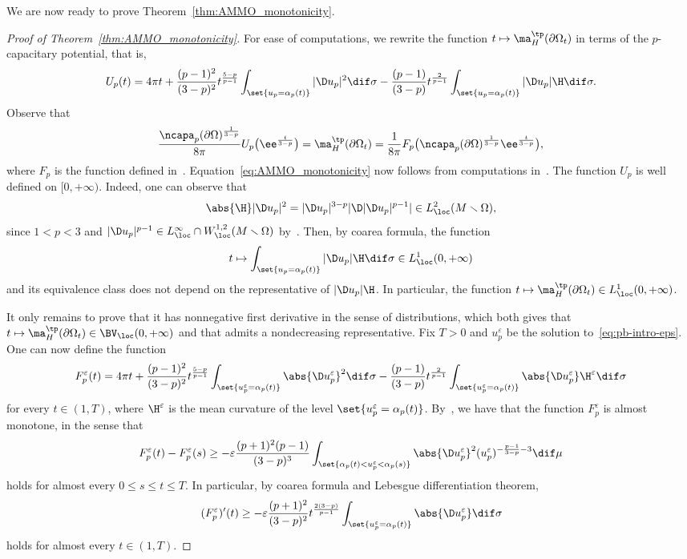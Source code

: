 We are now ready to prove Theorem~\ref{thm:AMMO_monotonicity}.

\begin{proof}[Proof of Theorem~\ref{thm:AMMO_monotonicity}] For ease of computations, we rewrite the function $t\mapsto \ma_{H}^{\tp}(\partial \Omega_t)$ in terms of the $p$-capacitary potential, that is,
\[
 U_p(t)= 4 \pi t + \frac{(p-1)^2}{(3-p)^2} t^{\frac{5-p}{p-1}} \int_{\set{u_p = \alpha_p(t)}} | \D u_p |^2 \dif \sigma -\frac{(p-1)}{(3-p)} t^{\frac{2}{p-1}} \int_{\set{u_p = \alpha_p(t)}} | \D u_p |\H \dif \sigma.
\]
Observe that
\[
 \frac{\ncapa_p(\partial \Omega)^\frac{1}{3-p}}{8\pi} U_p\big(\ee^{\frac{t}{3-p}}\big) = \ma_{H}^{\tp}(\partial \Omega_t)= \frac{1}{8\pi}F_p\big(\ncapa_p(\partial \Omega)^\frac{1}{3-p} \ee^{\frac{t}{3-p}}\big),
\]
where $F_p$ is the function defined in~\cite{agostiniani_riemannianpenroseinequalitynonlinear_2022}. Equation~\eqref{eq:AMMO_monotonicity} now follows from computations in~\cite[Section 1.2]{agostiniani_riemannianpenroseinequalitynonlinear_2022}. The function $U_p$ is well defined on $[0,+\infty)$. Indeed, one can observe that
\[
 \abs{ \H} | \D u_p |^2 = | \D u_p |^{3-p} | \D | \D u_p |^{p-1}| \in L^2_{\loc}(M\smallsetminus \Omega),
\]
since $1<p<3$ and $| \D u_p |^{p-1} \in L^\infty_{\loc}\cap W^{1,2}_{\loc} (M\smallsetminus \Omega)$ by~\cite[Lemma~2.1]{lou_singularsetslocalsolutions_2008}. Then, by coarea formula, the function
\[
 t \mapsto \int_{\set{u_p= \alpha_p(t)}} | \D u_p | \H \dif \sigma\in L^1_{\loc}(0,+\infty)
\]
and its equivalence class does not depend on the representative of $| \D u_p | \H $. In particular, the function $t\mapsto \ma_{H}^{\tp}(\partial \Omega_t) \in L^1_{\loc}(0,+\infty)$.

It only remains to prove that it has nonnegative first derivative in the sense of distributions, which both gives that $t\mapsto \ma_{H}^{\tp}(\partial \Omega_t) \in \BV_{\loc}(0,+\infty)$ and that admits a nondecreasing representative. Fix $T>0$ and $u^\varepsilon_p$ be the solution to~\eqref{eq:pb-intro-eps}. One can now define the function
\[
 F_p^\varepsilon(t)= 4 \pi t + \frac{(p-1)^2}{(3-p)^2} t^{\frac{5-p}{p-1}} \int_{\set{u^\varepsilon_p = \alpha_p(t)}} \abs{ \D u^\varepsilon_p}^2 \dif \sigma -\frac{(p-1)}{(3-p)} t^{\frac{2}{p-1}} \int_{\set{u^\varepsilon_p = \alpha_p(t)}} \abs{ \D u^\varepsilon_p}\H^\varepsilon\dif \sigma
\]
for every $t \in (1,T)$, where $\H^\varepsilon$ is the mean curvature of the level $\set{u^\varepsilon_p = \alpha_p(t)}$. By~\cite[Lemma~1.2]{agostiniani_riemannianpenroseinequalitynonlinear_2022}, we have that the function $F^\varepsilon_p$ is almost monotone, in the sense that
\[
 F^\varepsilon_p(t)- F^\varepsilon_p(s) \geq -\varepsilon
 \frac{(p+1)^2(p-1)}{(3-p)^3} \int_{ \set{\alpha_p(t) < u^\varepsilon_p<\alpha_p(s)}}\abs{ \D u_p^\varepsilon}^2(u^\varepsilon_p)^{-\frac{p-1}{3-p}-3} \dif \mu
\]
holds for almost every $0\leq s\leq t \leq T$.
In particular, by coarea formula and Lebesgue differentiation theorem,
\[
 (F^\varepsilon_p)'(t) \geq
 - \varepsilon \frac{(p+1)^2}{(3-p)^2}t^{\frac{2(3-p)}{p-1}} \int_{\set{u^\varepsilon_p=\alpha_p(t)}} \abs{ \D u^\varepsilon_p} \dif \sigma
\]
holds for almost every $t \in (1,T)$.


\end{proof}
